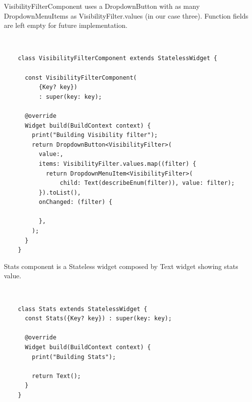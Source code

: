 	\mbox{}
	
	VisibilityFilterComponent uses a DropdownButton with as many DropdownMenuItems as VisibilityFilter.values (in our case three). Function fields are left empty for future implementation.
	
	\mbox{}\\
	
	 \mbox{}
	\begin{verbatim}
	class VisibilityFilterComponent extends StatelessWidget {
	
	  const VisibilityFilterComponent(
	      {Key? key})
	      : super(key: key);
	
	  @override
	  Widget build(BuildContext context) {
	    print("Building Visibility filter");
	    return DropdownButton<VisibilityFilter>(
	      value:,
	      items: VisibilityFilter.values.map((filter) {
	        return DropdownMenuItem<VisibilityFilter>(
	            child: Text(describeEnum(filter)), value: filter);
	      }).toList(),
	      onChanged: (filter) {
	       
	      },
	    );
	  }
	}
	\end{verbatim}
	
	\mbox{}
	
	Stats component is a Stateless widget composed by Text widget showing stats value.
	
	\mbox{}\\
	
	 \mbox{}
	\begin{verbatim}
	class Stats extends StatelessWidget {
	  const Stats({Key? key}) : super(key: key);
	
	  @override
	  Widget build(BuildContext context) {
	    print("Building Stats");
	
	    return Text();
	  }
	}
	\end{verbatim}
	
	\mbox{}
	
	
